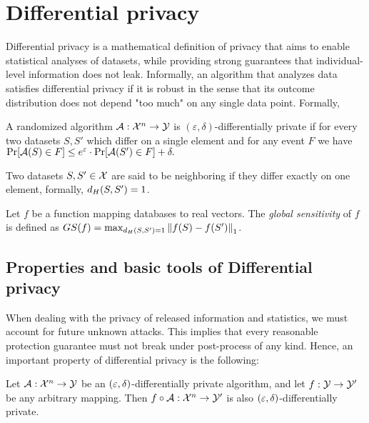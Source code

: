 \documentclass[12pt,a4paper,oneside,onecolumn]{book}
\begin{document}
\section{Differential privacy}

Differential privacy \citep{dwork2006calibrating} is a mathematical definition of privacy that aims to enable statistical analyses of datasets, while providing strong guarantees that individual-level information does not leak. Informally, an algorithm that analyzes data satisfies differential privacy if it is robust in the sense that its outcome distribution does not depend "too much" on any single data point. Formally,

\begin{definition}
  A randomized algorithm $\mathcal{A}:\mathcal{X}^n\to \mathcal{Y}$
  is $(\varepsilon,\delta)$-differentially private
  if for every two datasets $S,S'$ which differ on a single element and for any event $F$ we have 
  $\Pr[\mathcal{A}(S)\in F]\leq e^{\varepsilon}\cdot \Pr[\mathcal{A}(S')\in F]+\delta.$
\end{definition}

Two datasets $S, S'\in\mathcal{X}$ are said to be neighboring if they differ exactly on one element,
formally,
$d_H(S,S') = 1$.

\begin{definition}
Let $f$ be a function mapping databases to real vectors. 
The {\em global sensitivity} of $f$ is defined as 
$GS(f) = \max_{d_H(S,S')=1}\left\Vert f(S)-f(S') \right\Vert_1$.
\end{definition}

\subsection{Properties and basic tools of Differential privacy}

When dealing with the privacy of released information and statistics, we must account for future unknown attacks.
This implies that every reasonable protection guarantee must not break under post-process of any kind. 
Hence, an important property of differential privacy is the following:
\begin{theorem}
Let $\mathcal{A}:\mathcal{X}^n\to\mathcal{Y}$ be an $(\varepsilon, \delta)$-differentially private algorithm, and let $f:\mathcal{Y}\to\mathcal{Y}'$ be any arbitrary mapping. Then $f\circ\mathcal{A}:\mathcal{X}^n\to\mathcal{Y}'$ is also $(\varepsilon, \delta)$-differentially private.
\end{theorem}
\end{document}
